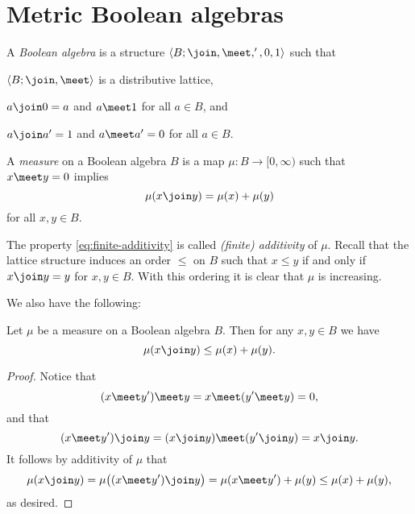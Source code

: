\documentclass[article, a4paper, 11pt, oneside]{memoir}
\numberwithin{equation}{chapter}
\begin{document}
\chapter{Metric Boolean algebras}

\begin{definition}
    A \emph{Boolean algebra} is a structure $\langle B; \join, \meet, ', 0, 1 \rangle$ such that
    \begin{enumdef}
        \item $\langle B; \join, \meet \rangle$ is a distributive lattice,
        \item $a \join 0 = a$ and $a \meet 1$ for all $a \in B$, and
        \item $a \join a' = 1$ and $a \meet a' = 0$ for all $a \in B$.
    \end{enumdef}
    A \emph{measure} on a Boolean algebra $B$ is a map $\mu \colon B \to [0,\infty)$ such that $x \meet y = 0$ implies
    \begin{equation}
        \label{eq:finite-additivity}
        \mu(x \join y)
            = \mu(x) + \mu(y)
    \end{equation}
    for all $x,y \in B$.
\end{definition}
%
The property \cref{eq:finite-additivity} is called \emph{(finite) additivity} of $\mu$. Recall that the lattice structure induces an order $\leq$ on $B$ such that $x \leq y$ if and only if $x \join y = y$ for $x,y \in B$. With this ordering it is clear that $\mu$ is increasing.

We also have the following:

\begin{lemma}
    Let $\mu$ be a measure on a Boolean algebra $B$. Then for any $x,y \in B$ we have
    \begin{equation*}
        \mu(x \join y)
            \leq \mu(x) + \mu(y).
    \end{equation*}
\end{lemma}

\begin{proof}
    Notice that
    \begin{equation*}
        (x \meet y') \meet y = x \meet (y' \meet y) = 0,
    \end{equation*}
    and that
    \begin{equation*}
        (x \meet y') \join y = (x \join y) \meet (y' \join y) = x \join y.
    \end{equation*}
    It follows by additivity of $\mu$ that
    \begin{equation*}
        \mu(x \join y)
            = \mu \bigl( (x \meet y') \join y \bigr)
            = \mu(x \meet y') + \mu(y)
            \leq \mu(x) + \mu(y),
    \end{equation*}
    as desired.
\end{proof}
\end{document}
